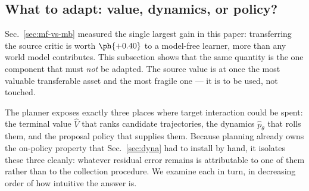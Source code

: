 
\subsection{What to adapt: value, dynamics, or policy?}
\label{sec:what-to-adapt}

Sec.~\ref{sec:mf-vs-mb} measured the single largest gain in this paper:
transferring the source critic is worth $\ph{+0.40}$ to a model-free learner,
more than any world model contributes. This subsection shows that the same
quantity is the one component that must \emph{not} be adapted. The source value
is at once the most valuable transferable asset and the most fragile one --- it
is to be used, not touched.

The planner exposes exactly three places where target interaction could be
spent: the terminal value $\hat V$ that ranks candidate trajectories, the
dynamics $\hat p_\theta$ that rolls them, and the proposal policy that supplies
them. Because planning already owns the on-policy property that
Sec.~\ref{sec:dyna} had to install by hand, it isolates these three cleanly:
whatever residual error remains is attributable to one of them rather than to
the collection procedure. We examine each in turn, in decreasing order of how
intuitive the answer is.

